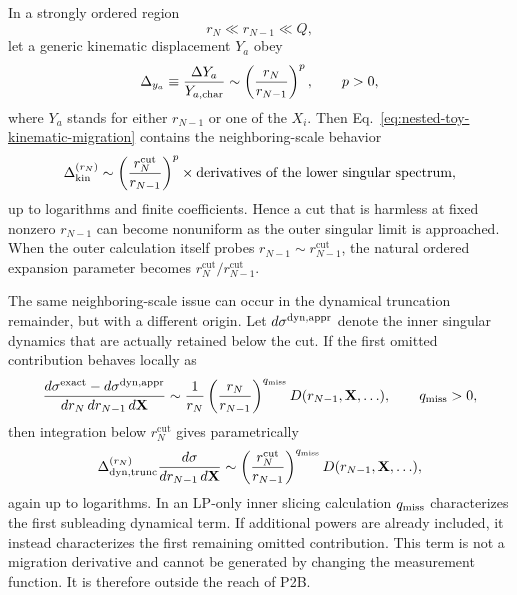 \documentclass[11pt]{article}
\newcommand{\rnm}{r_{N-1}}
\newcommand{\rn}{r_N}
\newcommand{\cut}{\mathrm{cut}}
\begin{document}
In a strongly ordered region
\begin{equation}
\rn\ll\rnm\ll Q,
\label{eq:lower-strong-ordering}
\end{equation}
let a generic kinematic displacement $Y_a$ obey
\begin{equation}
\Delta_{y_a}
\equiv
\frac{\Delta Y_a}{Y_{a,\rm char}}
\sim
\left(\frac{\rn}{\rnm}\right)^p,
\qquad p>0,
\label{eq:nested-toy-kinematic-scaling}
\end{equation}
where $Y_a$ stands for either $\rnm$ or one of the $X_i$. Then Eq.~\eqref{eq:nested-toy-kinematic-migration}
contains the neighboring-scale behavior
\begin{equation}
\Delta_{\rm kin}^{(\rn)}
\sim
\left(\frac{\rn^{\cut}}{\rnm}\right)^p
\times\hbox{derivatives of the lower singular spectrum},
\label{eq:nested-toy-kinematic-ratio}
\end{equation}
up to logarithms and finite coefficients. Hence a cut that is harmless at fixed nonzero $\rnm$ can become
nonuniform as the outer singular limit is approached. When the outer calculation itself probes
$\rnm\sim\rnm^{\cut}$, the natural ordered expansion parameter becomes
$\rn^{\cut}/\rnm^{\cut}$.

The same neighboring-scale issue can occur in the dynamical truncation remainder, but with a different origin.
Let $d\sigma^{\rm dyn,appr}$ denote the inner singular dynamics that are actually retained below the cut. If
the first omitted contribution behaves locally as
\begin{equation}
\frac{d\sigma^{\rm exact}-d\sigma^{\rm dyn,appr}}
{d\rn\,d\rnm\,d\mathbf X}
\sim
\frac{1}{\rn}
\left(\frac{\rn}{\rnm}\right)^{q_{\rm miss}}
D(\rnm,\mathbf X,\ldots),
\qquad q_{\rm miss}>0,
\label{eq:nested-toy-dynamic-local}
\end{equation}
then integration below $\rn^{\cut}$ gives parametrically
\begin{equation}
\Delta_{\rm dyn,trunc}^{(\rn)}
\frac{d\sigma}{d\rnm\,d\mathbf X}
\sim
\left(\frac{\rn^{\cut}}{\rnm}\right)^{q_{\rm miss}}
D(\rnm,\mathbf X,\ldots),
\label{eq:nested-toy-dynamic-ratio}
\end{equation}
again up to logarithms. In an LP-only inner slicing calculation $q_{\rm miss}$ characterizes the first
subleading dynamical term. If additional powers are already included, it instead characterizes the first
remaining omitted contribution. This term is not a migration derivative and cannot be generated by changing
the measurement function. It is therefore outside the reach of P2B.
\end{document}
